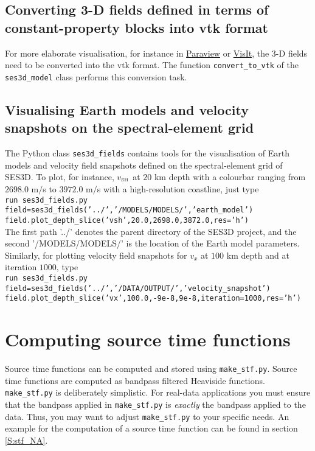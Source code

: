 \subsection{Converting 3-D fields defined in terms of constant-property blocks into vtk format}

For more elaborate visualisation, for instance in \href{www.paraview.org}{Paraview} or \href{https://wci.llnl.gov/codes/visit/}{VisIt}, the 3-D fields need to be converted into the vtk format. The function \texttt{convert\_to\_vtk} of the \texttt{ses3d\_model} class performs this conversion task.

\subsection{Visualising Earth models and velocity snapshots on the spectral-element grid}

The Python class \texttt{ses3d\_fields} contains tools for the visualisation of Earth models and velocity field snapshots defined on the spectral-element grid of SES3D. To plot, for instance, $v_\text{\tiny{SH}}$ at $20$ km depth with a colourbar ranging from $2698.0$ m$/$s to $3972.0$ m$/$s with a high-resolution coastline, just type\\[5pt]
\texttt{run ses3d\_fields.py\\
field=ses3d\_fields('../','/MODELS/MODELS/','earth\_model')\\
field.plot\_depth\_slice('vsh',20.0,2698.0,3872.0,res='h')}\\[5pt]
The first path '../' denotes the parent directory of the SES3D project, and the second '/MODELS/MODELS/' is the location of the Earth model parameters. Similarly, for plotting velocity field snapshots for $v_x$ at $100$ km depth and at iteration $1000$, type\\[5pt]
\texttt{run ses3d\_fields.py\\
field=ses3d\_fields('../','/DATA/OUTPUT/','velocity\_snapshot')\\
field.plot\_depth\_slice('vx',100.0,-9e-8,9e-8,iteration=1000,res='h')}\\


\section{Computing source time functions}

Source time functions can be computed and stored using \texttt{make\_stf.py}. Source time functions are computed as bandpass filtered Heaviside functions. \texttt{make\_stf.py} is deliberately simplistic. For real-data applications you must ensure that the bandpass applied in \texttt{make\_stf.py} is \emph{exactly} the bandpass applied to the data. Thus, you may want to adjust \texttt{make\_stf.py} to your specific needs. An example for the computation of a source time function can be found in section \ref{S:stf_NA}.


